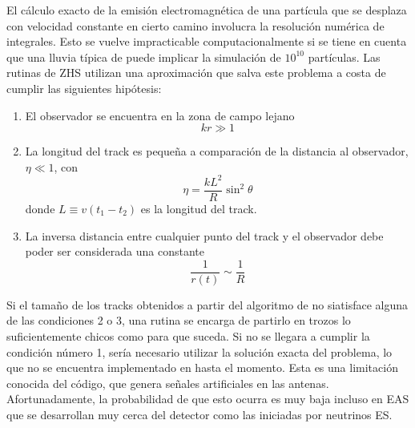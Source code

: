 		El c\'alculo exacto de la emisi\'on electromagn\'etica de una part\'icula que se desplaza con velocidad constante en cierto camino involucra la resoluci\'on num\'erica de integrales.
		Esto se vuelve impracticable computacionalmente si se tiene en cuenta que una lluvia típica de  puede implicar la simulación de $10^{10}$ partículas.
		Las rutinas de ZHS utilizan una aproximaci\'on que salva este problema a costa de cumplir las siguientes hip\'otesis:
		\begin{enumerate}
		\item El observador se encuentra en la zona de campo lejano
		\begin{equation}
		kr\gg1
		\end{equation}
		\item La longitud del track es peque\~na a comparaci\'on de la distancia al observador, $\eta\ll1$, con
		\begin{equation}
		\eta = \frac{k L^2}{R}\sin^2\theta
		\end{equation}
		donde $L\equiv v(t_1-t_2)$ es la longitud del track.
		\item La inversa distancia entre cualquier punto del track y el observador debe poder ser considerada una constante
		\begin{equation}
		\frac{1}{r(t)}\sim\frac{1}{R}
		\end{equation}
		\end{enumerate}
		Si el tama\~no de los tracks obtenidos a partir del algoritmo de \aires{} no siatisface alguna de las condiciones 2 o 3, una rutina se encarga de partirlo en trozos lo suficientemente chicos como para que suceda.
		Si no se llegara a cumplir la condici\'on n\'umero 1, ser\'ia necesario utilizar la soluci\'on exacta del problema, lo que no se encuentra implementado en \zhs{} hasta el momento.
		Esta es una limitaci\'on conocida del c\'odigo, que genera se\~nales artificiales en las antenas. Afortunadamente, la probabilidad de que esto ocurra es muy baja incluso en EAS que se desarrollan muy cerca del detector como las iniciadas por neutrinos ES.
		
